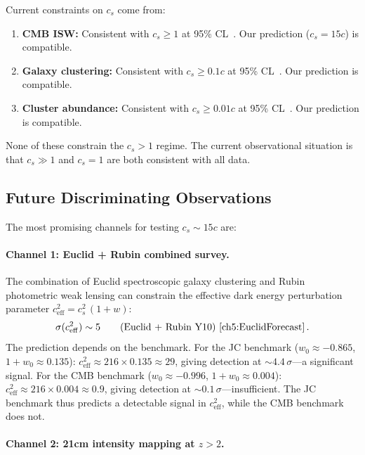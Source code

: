 Current constraints on $c_s$ come from:

\begin{enumerate}
\item \textbf{CMB ISW:} Consistent with $c_s \geq 1$ at 95\% CL~\cite{ch5:Hanson2013}. Our prediction ($c_s = 15c$) is compatible.
\item \textbf{Galaxy clustering:} Consistent with $c_s \geq 0.1c$ at 95\% CL~\cite{ch5:Alam2017}. Our prediction is compatible.
\item \textbf{Cluster abundance:} Consistent with $c_s \geq 0.01c$ at 95\% CL~\cite{ch5:Planck2018}. Our prediction is compatible.
\end{enumerate}

None of these constrain the $c_s > 1$ regime. The current observational situation is that $c_s \gg 1$ and $c_s = 1$ are both consistent with all data.

\subsection{Future Discriminating Observations}
\label{sec:5-future}

The most promising channels for testing $c_s \sim 15c$ are:

\paragraph{Channel 1: Euclid + Rubin combined survey.}

The combination of Euclid spectroscopic galaxy clustering and Rubin photometric weak lensing can constrain the effective dark energy perturbation parameter $c_\mathrm{eff}^2 = c_s^2\,(1+w)$:
\begin{equation}
  \sigma(c_\mathrm{eff}^2) \sim 5 \qquad\text{(Euclid + Rubin Y10)}~\cite{ch5:EuclidForecast}\,.
  \label{eq:5-28}
\end{equation}
The prediction depends on the benchmark. For the JC benchmark ($w_0 \approx -0.865$, $1+w_0 \approx 0.135$): $c_\mathrm{eff}^2 \approx 216 \times 0.135 \approx 29$, giving detection at ${\sim}4.4\,\sigma$---a significant signal. For the CMB benchmark ($w_0 \approx -0.996$, $1+w_0 \approx 0.004$): $c_\mathrm{eff}^2 \approx 216 \times 0.004 \approx 0.9$, giving detection at ${\sim}0.1\,\sigma$---insufficient. The JC benchmark thus predicts a detectable signal in $c_\mathrm{eff}^2$, while the CMB benchmark does not.

\paragraph{Channel 2: 21cm intensity mapping at $z > 2$.}

